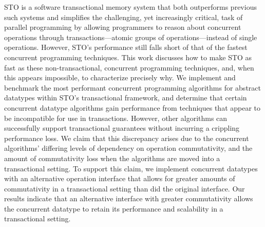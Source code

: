 STO is a software transactional memory system that both outperforms previous such systems and simplifies the challenging, yet increasingly critical, task of parallel programming by allowing programmers to reason about concurrent operations through transactions---atomic groups of operations---instead of single operations.  
However, STO's performance still falls short of that of the fastest concurrent programming techniques. This work discusses how to make STO as fast as these non-transactional, concurrent programming techniques, and, when this appears impossible, to characterize precisely why. 
We implement and benchmark the most performant concurrent programming algorithms for abstract datatypes within STO's transactional framework, and determine that certain concurrent datatype algorithms gain performance from techniques that appear to be incompatible for use in transactions.
However, other algorithms can successfully support transactional guarantees without incurring a crippling performance loss. We claim that this discrepancy arises due to the concurrent algorithms' differing levels of dependency on operation commutativity, and the amount of commutativity loss when the algorithms are moved into a transactional setting. To support this claim, we implement concurrent datatypes with an alternative operation interface that allows for greater amounts of commutativity in a transactional setting than did the original interface. Our results indicate that an alternative interface with greater commutativity allows the concurrent datatype to retain its performance and scalability in a transactional setting.

